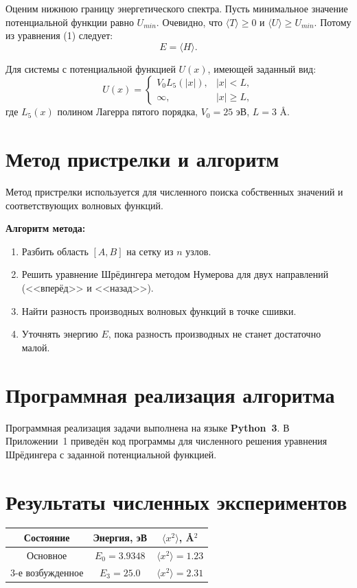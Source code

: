 \documentclass[a4paper,12pt]{article}
\begin{document}
Оценим нижнюю границу энергетического спектра. Пусть минимальное значение потенциальной функции равно $U_{min}$. Очевидно, что $\langle T \rangle \geq 0$ и $\langle U \rangle \geq U_{min}$. Потому из уравнения (1) следует:
\begin{equation}
    E = \langle H \rangle.
\end{equation}

Для системы с потенциальной функцией \( U(x) \), имеющей заданный вид:
\begin{equation}
U(x) =
\begin{cases}
V_0 L_5(|x|), & |x| < L, \\
\infty, & |x| \geq L,
\end{cases}
\end{equation}
где $L_5(x)$ \textendash{} полином Лагерра пятого порядка, $V_0 = 25$ эВ, $L = 3$ \AA.

\section{Метод пристрелки и алгоритм}
Метод пристрелки используется для численного поиска собственных значений и соответствующих волновых функций.

\textbf{Алгоритм метода:}
\begin{enumerate}
    \item Разбить область $[A, B]$ на сетку из $n$ узлов.
    \item Решить уравнение Шрёдингера методом Нумерова для двух направлений (<<вперёд>> и <<назад>>).
    \item Найти разность производных волновых функций в точке сшивки.
    \item Уточнять энергию $E$, пока разность производных не станет достаточно малой.
\end{enumerate}

\section{Программная реализация алгоритма}
Программная реализация задачи выполнена на языке \textbf{Python~3}. В Приложении~1 приведён код программы для численного решения уравнения Шрёдингера с заданной потенциальной функцией.

\section{Результаты численных экспериментов}

\begin{table}[H]
\centering
\begin{tabular}{|c|c|c|}
\hline
\textbf{Состояние} & \textbf{Энергия, эВ} & $\langle x^2 \rangle$, \AA$^2$ \\
\hline
Основное & $E_0 = 3.9348$ & $\langle x^2 \rangle = 1.23$ \\
3-е возбужденное & $E_3 = 25.0$ & $\langle x^2 \rangle = 2.31$ \\
\hline
\end{tabular}
\end{table}
\end{document}
